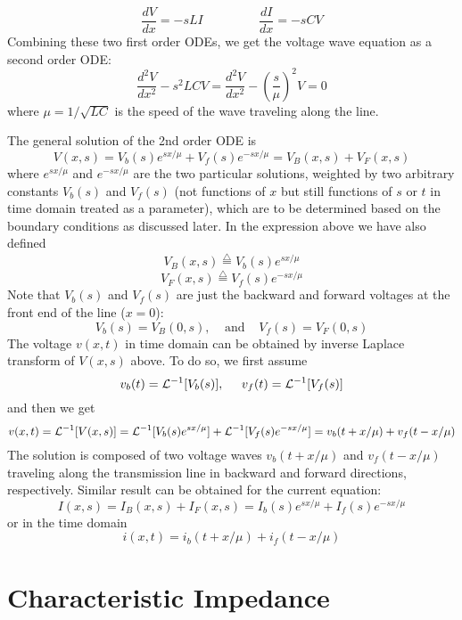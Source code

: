 \[ \frac{dV}{dx}=-sLI\;\;\;\;\;\;\;\;\;\;\;\;\;\;\;\;\frac{dI}{dx}=-sCV	\]
Combining these two first order ODEs, we get the voltage wave equation as
a second order ODE:
\[	\frac{d^2 V}{d x^2}-s^2LCV
	=\frac{d^2 V}{d x^2}-\left(\frac{s}{\mu}\right)^2V=0	\]
where $\mu=1/\sqrt{LC}$ is the speed of the wave traveling along the line.

The general solution of the 2nd order ODE is
\[	V(x,s)=V_b(s)e^{sx/\mu}+V_f(s)e^{-sx/\mu}=V_B(x,s)+V_F(x,s)	\]
where $e^{sx/\mu}$ and $e^{-sx/\mu}$ are the two particular solutions, weighted
by two arbitrary constants $V_b(s)$ and $V_f(s)$ (not functions of $x$ but 
still functions of $s$ or $t$ in time domain treated as a parameter), which
are to be determined based on the boundary conditions as discussed later. 
In the expression above we have also defined
\[	V_B(x,s)\stackrel{\triangle}{=}V_b(s)e^{ sx/\mu} \]
\[	V_F(x,s)\stackrel{\triangle}{=}V_f(s)e^{-sx/\mu} \]
Note that $V_b(s)$ and $V_f(s)$ are just the backward and forward voltages
at the front end of the line ($x=0$):
\[	V_b(s)=V_B(0,s),\;\;\;\;\mbox{and}\;\;\;\;V_f(s)=V_F(0,s)	\]
The voltage $v(x,t)$ in time domain can be obtained by inverse Laplace 
transform of $V(x,s)$ above. To do so, we first assume
\[ v_b(t)={\cal L}^{-1}[V_b(s)],\;\;\;\;\;v_f(t)={\cal L}^{-1}[V_f(s)] \]
and then we get
\[ v(x,t)={\cal L}^{-1}[V(x,s)]={\cal L}^{-1}[V_b(s)e^{sx/\mu}]+{\cal L}^{-1}[V_f(s)e^{-sx/\mu}]
=v_b(t+x/\mu)+v_f(t-x/\mu)	\]
The solution is composed of two voltage waves $v_b(t+x/\mu)$ and $v_f(t-x/\mu)$
traveling along the transmission line in backward and forward directions, 
respectively. Similar result can be obtained for the current equation:
\[	I(x,s)=I_B(x,s)+I_F(x,s)=I_b(s)e^{sx/\mu}+I_f(s)e^{-sx/\mu} \]
or in the time domain
\[	i(x,t)=i_b(t+x/\mu)+i_f(t-x/\mu)	\]


\section*{Characteristic Impedance}

